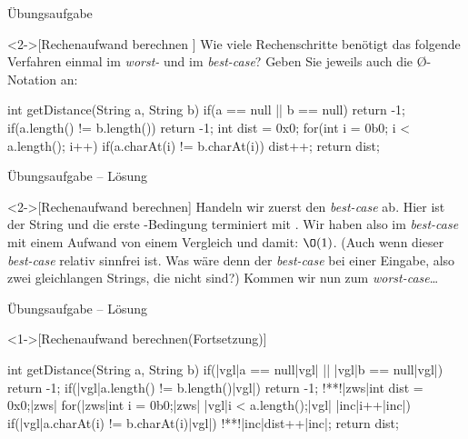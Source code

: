 \begin{frame}[fragile,c]{Übungsaufgabe}
    \begin{exercise}<2->[Rechenaufwand berechnen ]
        \pause{}Wie viele Rechenschritte benötigt das folgende Verfahren einmal im \emph{worst-} und im \emph{best-case}? Geben Sie jeweils auch die \O-Notation an: \pause{}
\begin{plainjava}
int getDistance(String a, String b){
    if(a == null || b == null) return -1;
    if(a.length() != b.length()) return -1;
    int dist = 0x0;
    for(int i = 0b0; i < a.length(); i++)
        if(a.charAt(i) != b.charAt(i))
            dist++;
    return dist;
}
\end{plainjava}
    \end{exercise}
\end{frame}

\begin{frame}[c]{Übungsaufgabe -- Lösung}
    \begin{solve}<2->[Rechenaufwand berechnen]
    \pause{}Handeln wir zuerst den \emph{best-case} ab.\pause{} Hier ist der String   und die erste -Bedingung terminiert mit .\pause{} Wir haben also im \emph{best-case} mit einem Aufwand von einem Vergleich und damit: \(\O(1)\).\pause{} (Auch wenn dieser \emph{best-case} relativ sinnfrei ist.\pause{} Was wäre denn der \emph{best-case} bei einer  Eingabe\pause{}, also zwei gleichlangen Strings, die nicht  sind?)\pause{} Kommen wir nun zum \emph{worst-case}\ldots
    \end{solve}
\end{frame}

\begin{frame}[fragile,c]{Übungsaufgabe -- Lösung}
    \addtocounter{solve}{-1}%
    \begin{solve}<1->[Rechenaufwand berechnen\hfill{}(Fortsetzung)]
\begin{plainjava}[language=xJava]
int getDistance(String a, String b){
    if(|vgl|a == null|vgl| || |vgl|b == null|vgl|) return -1;
    if(|vgl|a.length() != b.length()|vgl|) return -1;
    !**!|zws|int dist = 0x0;|zws|
    for(|zws|int i = 0b0;|zws| |vgl|i < a.length();|vgl| |inc|i++|inc|)
        if(|vgl|a.charAt(i) != b.charAt(i)|vgl|)
            !**!|inc|dist++|inc|;
    return dist;
}
\end{plainjava}
    \end{solve}
\end{frame}


